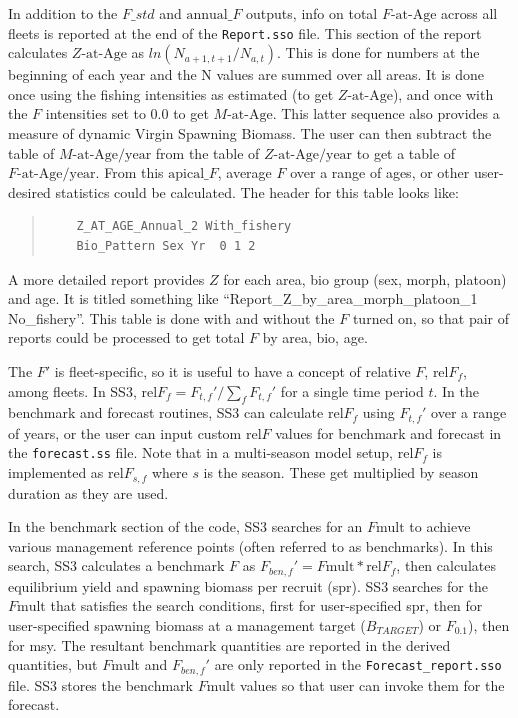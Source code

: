 In addition to the $F\_std$ and $\text{annual\_}F$ outputs, info on total $F\text{-at-Age}$ across all fleets is reported at the end of the \texttt{Report.sso} file. This section of the report calculates $Z\text{-at-Age}$ as $ln(N_{a+1,t+1}/N_{a,t})$. This is done for numbers at the beginning of each year and the N values are summed over all areas. It is done once using the fishing intensities as estimated (to get $Z\text{-at-Age}$), and once with the $F$ intensities set to 0.0 to get $M\text{-at-Age}$. This latter sequence also provides a measure of dynamic Virgin Spawning Biomass. The user can then subtract the table of $M\text{-at-Age/year}$ from the table of $Z\text{-at-Age/year}$ to get a table of $F\text{-at-Age/year}$. From this $\text{apical\_}F$, average $F$ over a range of ages, or other user-desired statistics could be calculated. The header for this table looks like:
\begin{quote}
	\begin{verbatim}
	Z_AT_AGE_Annual_2 With_fishery
	Bio_Pattern Sex Yr  0 1 2
	\end{verbatim}
\end{quote}

A more detailed report provides $Z$ for each area, bio group (sex, morph, platoon) and age. It is titled something like ``Report\_Z\_by\_area\_morph\_platoon\_1 No\_fishery''. This table is done with and without the $F$ turned on, so that pair of reports could be processed to get total $F$ by area, bio, age.

The $F'$ is fleet-specific, so it is useful to have a concept of relative $F$, $\text{rel}F_f$, among fleets. In SS3, $\text{rel}F_f= F_{t,f}'/\sum_{f}^{}F_{t,f}'$ for a single time period $t$. In the benchmark and forecast routines, SS3 can calculate $\text{rel}F_f$ using $F_{t,f}'$ over a range of years, or the user can input custom $\text{rel}F$ values for benchmark and forecast in the \texttt{forecast.ss} file. Note that in a multi-season model setup, $\text{rel}F_f$ is implemented as $\text{rel}F_{s,f}$ where $s$ is the season. These get multiplied by season duration as they are used.

In the benchmark section of the code, SS3 searches for an $F\text{mult}$ to achieve various management reference points (often referred to as benchmarks). In this search, SS3 calculates a benchmark $F$ as $F_{ben,f}' = F\text{mult} * \text{rel}F_f$, then calculates equilibrium yield and spawning biomass per recruit (\gls{spr}). SS3 searches for the $F\text{mult}$ that satisfies the search conditions, first for user-specified \gls{spr}, then for user-specified spawning biomass at a management target ($B_{TARGET}$) or $F_{0.1}$), then for \gls{msy}. The resultant benchmark quantities are reported in the derived quantities, but $F\text{mult}$ and $F_{ben,f}'$ are only reported in the \texttt{Forecast\_report.sso} file. SS3 stores the benchmark $F\text{mult}$ values so that user can invoke them for the forecast.

